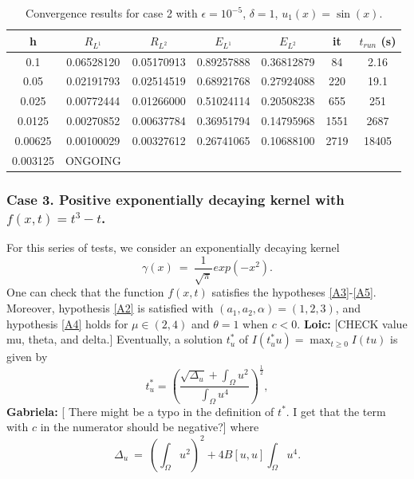 \documentclass[11pt]{amsart}   	%
\theoremstyle{plain}
\numberwithin{equation}{section}
\newcommand{\LC}[1]{{\color{purple} {\bf Loic:} [#1] }}
\newcommand{\GJ}[1]{{\color{red} {\bf Gabriela:} [#1] }}
\begin{document}
\begin{table}[H]
    \centering
    \caption{Convergence results for case 2 with $\epsilon=10^{-5}$, $\delta=1$, $u_1(x)=\sin(x)$.}%
    \begin{tabular}{|c||c|c||c|c||c|c|}
    \hline
    h & $R_{L^1}$ & $R_{L^2} $  & $E_{L^1}$ & $E_{L^2}$ & it & $t_{run}$ (s)
    \\ \hline
    0.1 &  0.06528120 &  0.05170913 & 0.89257888 & 0.36812879 & 84 & 2.16 
    \\ \hline
    0.05 & 0.02191793 & 0.02514519 & 0.68921768 & 0.27924088 & 220 & 19.1
    \\ \hline
    0.025 & 0.00772444 & 0.01266000 & 0.51024114 & 0.20508238 & 655 & 251   
    \\ \hline
    0.0125 & 0.00270852 & 0.00637784 & 0.36951794 & 0.14795968 & 1551 & 2687
    \\ \hline
    0.00625 & 0.00100029 & 0.00327612 & 0.26741065 & 0.10688100 & 2719 &  18405   
    \\ \hline
    0.003125 & ONGOING & & & & &  
    \\ \hline  
    \end{tabular}
    \label{tab:num_case_2bis}
\end{table}


\subsubsection{Case 3. Positive exponentially decaying kernel with $f(x,t)=t^3-t$.}
For this series of tests, we consider an exponentially decaying kernel
$$\gamma(x) \ = \ \frac{1}{\sqrt{\pi}} exp(-x^2). $$
One can check that the function $f(x,t)$ satisfies the hypotheses \ref{A3}-\ref{A5}. Moreover, hypothesis \ref{A2} is satisfied with $(a_1,a_2,\alpha)=(1,2,3)$, and hypothesis \ref{A4} holds for $\mu\in(2,4)$ and $\theta=1$ when $c<0$. \LC{CHECK value mu, theta, and delta.}
Eventually, a solution $t^*_u$ of $I(t^*_u u)  = \max_{t\geq 0} I(tu)$ is given by
$$t^*_u = \left( \frac{\sqrt{\Delta_u} + \int_\Omega u^2}{\int_\Omega u^4} \right)^{\frac{1}{2}},$$
\GJ{ There might be a typo in the definition of $t^*$. I get that the term with $c$ in the numerator should be negative?}
where
$$\Delta_u \ = \ \left(\int_\Omega u^2\right)^2 + 4 B[u,u] \int_\Omega u^4 .$$
\end{document}
